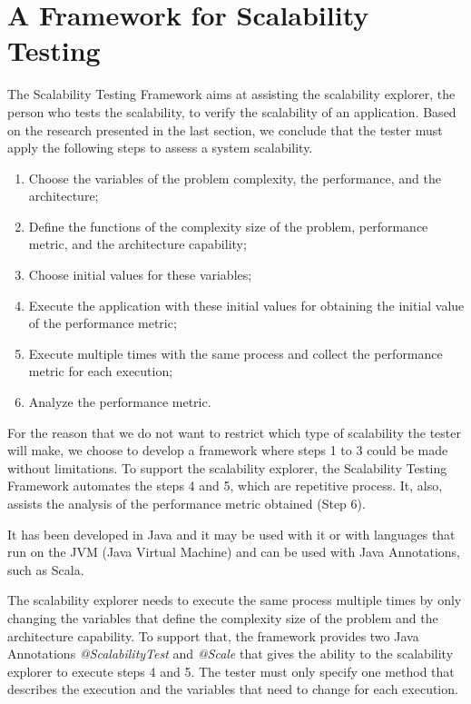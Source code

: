 \section{A Framework for Scalability Testing}

The Scalability Testing Framework aims at assisting the scalability explorer, the person who tests the scalability, to verify the scalability of an application. Based on the research presented in the last section, we conclude that the tester must apply the following steps to assess a system scalability. 

\begin{enumerate}
\item Choose the variables of the problem complexity, the performance, and the architecture;
\item Define the functions of the complexity size of the problem, performance metric, and the architecture capability;
\item Choose initial values for these variables;
\item Execute the application with these initial values for obtaining the initial value of the performance metric;
\item Execute multiple times with the same process and collect the performance metric for each execution;
\item Analyze the performance metric.
\end{enumerate}

For the reason that we do not want to restrict which type of scalability the tester will make, we choose to develop a framework where steps 1 to 3 could be made without limitations.
To support the scalability explorer, the Scalability Testing Framework automates the steps 4 and 5, which are repetitive process. It, also, assists the analysis of the performance metric obtained (Step 6).

It has been developed in Java and it may be used with it or with languages that run on the JVM (Java Virtual Machine) and can be used with Java Annotations, such as Scala.

The scalability explorer needs to execute the same process multiple times by only changing the variables that define the complexity size of the problem and the architecture capability. To support that, the framework provides two Java Annotations \emph{@ScalabilityTest} and \emph{@Scale} that gives the ability to the scalability explorer to execute steps 4 and 5. The tester must only specify one method that describes the execution and the variables that need to change for each execution.


